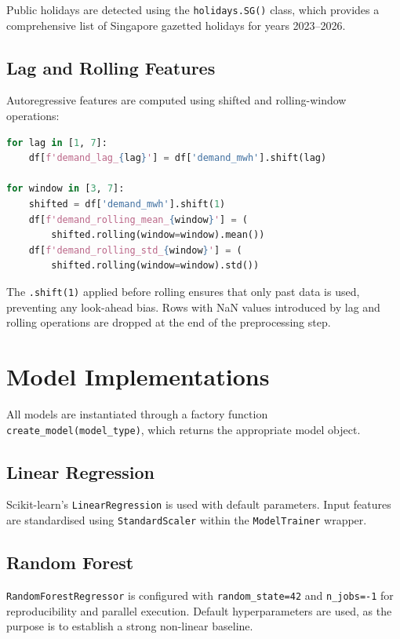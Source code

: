 Public holidays are detected using the \texttt{holidays.SG()} class, which provides a comprehensive list of Singapore gazetted holidays for years 2023--2026.

\subsection{Lag and Rolling Features}

Autoregressive features are computed using shifted and rolling-window operations:
\begin{lstlisting}[language=Python, caption={Lag and rolling feature construction.}, label={lst:lag_rolling}]
for lag in [1, 7]:
    df[f'demand_lag_{lag}'] = df['demand_mwh'].shift(lag)

for window in [3, 7]:
    shifted = df['demand_mwh'].shift(1)
    df[f'demand_rolling_mean_{window}'] = (
        shifted.rolling(window=window).mean())
    df[f'demand_rolling_std_{window}'] = (
        shifted.rolling(window=window).std())
\end{lstlisting}

The \texttt{.shift(1)} applied before rolling ensures that only past data is used, preventing any look-ahead bias. Rows with NaN values introduced by lag and rolling operations are dropped at the end of the preprocessing step.


\section{Model Implementations}\label{sec:model_impl}

All models are instantiated through a factory function \texttt{create\_model(model\_type)}, which returns the appropriate model object.

\subsection{Linear Regression}

Scikit-learn's \texttt{LinearRegression} is used with default parameters. Input features are standardised using \texttt{StandardScaler} within the \texttt{ModelTrainer} wrapper.

\subsection{Random Forest}

\texttt{RandomForestRegressor} is configured with \texttt{random\_state=42} and \texttt{n\_jobs=-1} for reproducibility and parallel execution. Default hyperparameters are used, as the purpose is to establish a strong non-linear baseline.


